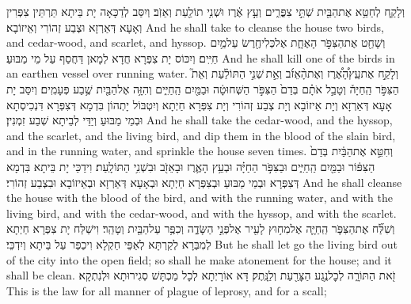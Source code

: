 {וְלָקַ֛ח לְחַטֵּ֥א אֶת\maqqaf הַבַּ֖יִת שְׁתֵּ֣י צִפֳּרִ֑ים וְעֵ֣ץ אֶ֔רֶז וּשְׁנִ֥י תוֹלַ֖עַת וְאֵזֹֽב׃}
{וְיִסַּב לְדַכָּאָה יָת בֵּיתָא תַּרְתֵּין צִפְּרִין וְאָעָא דְּאַרְזָא וּצְבַע זְהוֹרִי וְאֵיזוֹבָא׃}
{And he shall take to cleanse the house two birds, and cedar-wood, and scarlet, and hyssop.}{}
{וְשָׁחַ֖ט אֶת\maqqaf הַצִּפֹּ֣ר הָאֶחָ֑ת אֶל\maqqaf כְּלִי\maqqaf חֶ֖רֶשׂ עַל\maqqaf מַ֥יִם חַיִּֽים׃}
{וְיִכּוֹס יָת צִפְּרָא חֲדָא לְמָאן דַּחֲסַף עַל מֵי מַבּוּעַ׃}
{And he shall kill one of the birds in an earthen vessel over running water.}{}
{וְלָקַ֣ח אֶת\maqqaf עֵֽץ\maqqaf הָ֠אֶ֠רֶז וְאֶת\maqqaf הָ֨אֵזֹ֜ב וְאֵ֣ת \legarmeh  שְׁנִ֣י הַתּוֹלַ֗עַת וְאֵת֮ הַצִּפֹּ֣ר הַֽחַיָּה֒ וְטָבַ֣ל אֹתָ֗ם בְּדַם֙ הַצִּפֹּ֣ר הַשְּׁחוּטָ֔ה וּבַמַּ֖יִם הַֽחַיִּ֑ים וְהִזָּ֥ה אֶל\maqqaf הַבַּ֖יִת שֶׁ֥בַע פְּעָמִֽים׃}
{וְיִסַּב יָת אָעָא דְּאַרְזָא וְיָת אֵיזוֹבָא וְיָת צְבַע זְהוֹרִי וְיָת צִפְּרָא חַיְתָא וְיִטְבּוֹל יָתְהוֹן בִּדְמָא דְּצִפְּרָא דִּנְכִיסְתָא וּבְמֵי מַבּוּעַ וְיַדֵּי לְבֵיתָא שְׁבַע זִמְנִין׃}
{And he shall take the cedar-wood, and the hyssop, and the scarlet, and the living bird, and dip them in the blood of the slain bird, and in the running water, and sprinkle the house seven times.}{}
{וְחִטֵּ֣א אֶת\maqqaf הַבַּ֔יִת בְּדַם֙ הַצִּפּ֔וֹר וּבַמַּ֖יִם הַֽחַיִּ֑ים וּבַצִּפֹּ֣ר הַחַיָּ֗ה וּבְעֵ֥ץ הָאֶ֛רֶז וּבָאֵזֹ֖ב וּבִשְׁנִ֥י הַתּוֹלָֽעַת׃}
{וִידַכֵּי יָת בֵּיתָא בִּדְמָא דְּצִפְּרָא וּבְמֵי מַבּוּעַ וּבְצִפְּרָא חַיְתָא וּבְאָעָא דְּאַרְזָא וּבְאֵיזוֹבָא וּבִצְבַע זְהוֹרִי׃}
{And he shall cleanse the house with the blood of the bird, and with the running water, and with the living bird, and with the cedar-wood, and with the hyssop, and with the scarlet.}{}
{וְשִׁלַּ֞ח אֶת\maqqaf הַצִּפֹּ֧ר הַֽחַיָּ֛ה אֶל\maqqaf מִח֥וּץ לָעִ֖יר אֶל\maqqaf פְּנֵ֣י הַשָּׂדֶ֑ה וְכִפֶּ֥ר עַל\maqqaf הַבַּ֖יִת וְטָהֵֽר׃}
{וִישַׁלַּח יָת צִפְּרָא חַיְתָא לְמִבַּרָא לְקַרְתָּא לְאַפֵּי חַקְלָא וִיכַפַּר עַל בֵּיתָא וְיִדְכֵּי׃}
{But he shall let go the living bird out of the city into the open field; so shall he make atonement for the house; and it shall be clean.}{}
{זֹ֖את הַתּוֹרָ֑ה לְכׇל\maqqaf נֶ֥גַע הַצָּרַ֖עַת וְלַנָּֽתֶק׃}
{דָּא אוֹרָיְתָא לְכָל מַכְתָּשׁ סְגִירוּתָא וּלְנִתְקָא׃}
{This is the law for all manner of plague of leprosy, and for a scall;}{}
